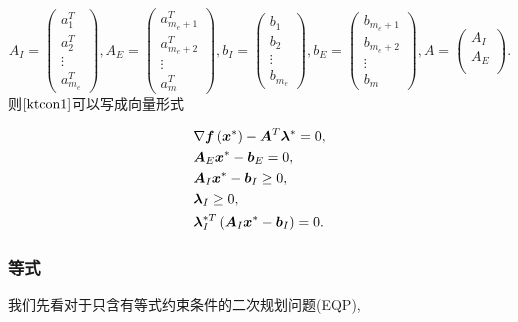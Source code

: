 \documentclass[12pt,oneside,a4paper]{article}
\begin{document}
\begin{equation*}
A_{I}=\left(
\begin{array}{c}
a_{1}^{T} \\
a_{2}^{T} \\
\vdots \\
a_{m_e}^{T}
\end{array}\right),
A_{E}=\left(
\begin{array}{c}
a_{m_{e}+1}^{T} \\
a_{m_{e}+2}^{T} \\
\vdots \\
a_{m}^{T}
\end{array}\right),
b_{I}=\left(
\begin{array}{c}
b_{1} \\
b_{2} \\
\vdots \\
b_{m_e}
\end{array}\right),
b_{E}=\left(
\begin{array}{c}
b_{m_{e}+1} \\
b_{m_{e}+2} \\
\vdots \\
b_{m}
\end{array}\right),
A=\left(
\begin{array}{c}
A_{I} \\
A_{E} \\
\end{array}\right).
\end{equation*}
则$\ref{ktcon1}$可以写成向量形式

\begin{align}\label{ktcon2}
\begin{split}
&\nabla {\boldsymbol f}\left({\boldsymbol x}^{*}\right)-{\boldsymbol A}^{T} \boldsymbol{\lambda}^{*}=0,\\
&{\boldsymbol A}_{E} {\boldsymbol x}^{*}-{\boldsymbol b}_{E}=0,\\
&{\boldsymbol A}_{I} {\boldsymbol x}^{*}-{\boldsymbol b}_{I} \geq 0,\\
&\boldsymbol{\lambda}_{I} \geq 0,\\
&\boldsymbol{\lambda}_{I}^{* T}\left({\boldsymbol A}_{I} {\boldsymbol x}^{*}-{\boldsymbol b}_{I}\right)=0.
\end{split}
\end{align}
\subsubsection{等式}
我们先看对于只含有等式约束条件的二次规划问题(EQP),
\end{document}
